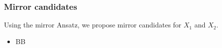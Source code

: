 \begin{frame}
\frametitle{Mirror candidates}

Using the mirror Ansatz, we propose mirror candidates for $X_1$ and $X_2$.

\begin{itemize}
	\item
	BB
\end{itemize}


\end{frame}